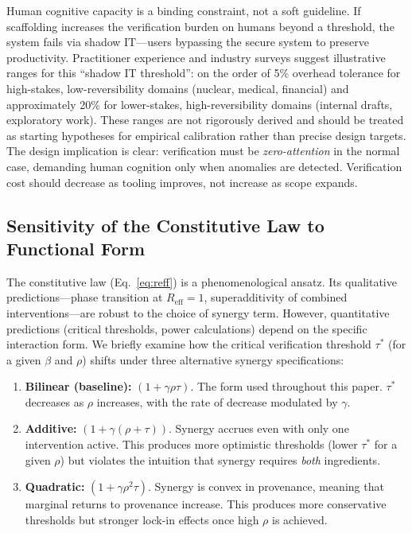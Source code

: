 \documentclass[runningheads]{llncs}
\begin{document}
Human cognitive capacity is a binding constraint, not a soft guideline. If scaffolding increases the verification burden on humans beyond a threshold, the system fails via shadow IT---users bypassing the secure system to preserve productivity. Practitioner experience and industry surveys suggest illustrative ranges for this ``shadow IT threshold'': on the order of 5\% overhead tolerance for high-stakes, low-reversibility domains (nuclear, medical, financial) and approximately 20\% for lower-stakes, high-reversibility domains (internal drafts, exploratory work). These ranges are not rigorously derived and should be treated as starting hypotheses for empirical calibration rather than precise design targets. The design implication is clear: verification must be \emph{zero-attention} in the normal case, demanding human cognition only when anomalies are detected. Verification cost should decrease as tooling improves, not increase as scope expands.

\subsection{Sensitivity of the Constitutive Law to Functional Form}
\label{sec:sensitivity}

The constitutive law (Eq.~\ref{eq:reff}) is a phenomenological ansatz. Its qualitative predictions---phase transition at $R_{\mathrm{eff}} = 1$, superadditivity of combined interventions---are robust to the choice of synergy term. However, quantitative predictions (critical thresholds, power calculations) depend on the specific interaction form. We briefly examine how the critical verification threshold $\tau^*$ (for a given $\beta$ and $\rho$) shifts under three alternative synergy specifications:

\begin{enumerate}
\item \textbf{Bilinear (baseline):} $(1+\gamma\rho\tau)$. The form used throughout this paper. $\tau^*$ decreases as $\rho$ increases, with the rate of decrease modulated by $\gamma$.
\item \textbf{Additive:} $(1+\gamma(\rho+\tau))$. Synergy accrues even with only one intervention active. This produces more optimistic thresholds (lower $\tau^*$ for a given $\rho$) but violates the intuition that synergy requires \emph{both} ingredients.
\item \textbf{Quadratic:} $(1+\gamma\rho^2\tau)$. Synergy is convex in provenance, meaning that marginal returns to provenance increase. This produces more conservative thresholds but stronger lock-in effects once high $\rho$ is achieved.
\end{enumerate}
\end{document}
